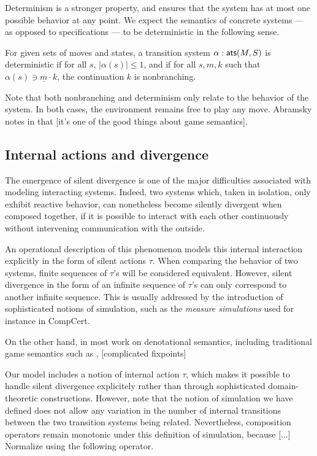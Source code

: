 {Determinism is a stronger property,
and ensures that the system has at most one possible behavior
at any point.
We expect the semantics of concrete systems ---
as opposed to specifications ---
to be deterministic in the following sense.

\begin{definition}
For given sets of moves and states,
a transition system $\alpha :  \mathsf{ats} (M, S)$
is deterministic if for all $s$, $|\alpha(s)| \le 1$,
and if for all $s, m, k$ such that $\alpha(s) \ni \underline{m} \cdot k$,
the continuation $k$ is nonbranching.
\end{definition}

Note that both nonbranching and determinism
only relate to the behavior of the system.
In both cases,
the environment remains free to play any move.
Abramsky notes in \cite{cspgs}
that [it's one of the good things about game semantics].

\subsection{Internal actions and divergence}

The emergence of silent divergence
is one of the major difficulties
associated with modeling interacting systems.
Indeed,
two systems which, taken in isolation,
only exhibit reactive behavior,
can nonetheless become silently divergent when composed together,
if it is possible to interact with each other continuously
without intervening communication with the outside.

An operational description of this phenomenon
models this internal interaction explicitly
in the form of silent actions $\tau$.
When comparing the behavior of two systems,
finite sequences of $\tau$'s will be considered equivalent.
However,
silent divergence in the form of an infinite sequence of $\tau$'s
can only correspond to another infinite sequence.
This is usually addressed by the introduction of
sophisticated notions of simulation,
such as the \emph{measure simulations} used for instance in CompCert.

On the other hand,
in most work on denotational semantics,
including traditional game semantics such as \cite{pcfgs},
[complicated fixpoints] 

Our model includes a notion of internal action $\tau$,
which makes it possible to handle silent divergence explicitely
rather than through sophisticated domain-theoretic constructions.
However,
note that the notion of simulation we have defined
does not allow any variation
in the number of internal transitions
between the two transition systems being related.
Nevertheless,
composition operators remain monotonic
under this definition of simulation,
because [...]
Normalize using the following operator.

}
